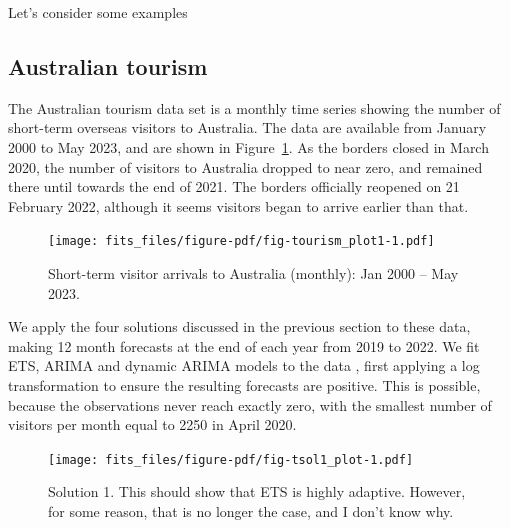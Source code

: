 \documentclass[11pt,a4paper,]{article}
\begin{document}
Let's consider some examples

\hypertarget{australian-tourism}{%
\subsection{Australian tourism}\label{australian-tourism}}

The Australian tourism data set is a monthly time series showing the
number of short-term overseas visitors to Australia. The data
\autocite{tourismdata} are available from January 2000 to May 2023, and
are shown in Figure~\ref{fig-tourism_plot1}. As the borders closed in
March 2020, the number of visitors to Australia dropped to near zero,
and remained there until towards the end of 2021. The borders officially
reopened on 21 February 2022, although it seems visitors began to arrive
earlier than that.

\begin{figure}

{\centering \texttt{[image: fits\_files/figure-pdf/fig-tourism\_plot1-1.pdf]}

}

\caption{\label{fig-tourism_plot1}Short-term visitor arrivals to
Australia (monthly): Jan 2000 -- May 2023.}

\end{figure}

We apply the four solutions discussed in the previous section to these
data, making 12 month forecasts at the end of each year from 2019 to
2022. We fit ETS, ARIMA and dynamic ARIMA models to the data
\autocite{fpp3}, first applying a log transformation to ensure the
resulting forecasts are positive. This is possible, because the
observations never reach exactly zero, with the smallest number of
visitors per month equal to 2250 in April 2020.

\begin{figure}[t]

{\centering \texttt{[image: fits\_files/figure-pdf/fig-tsol1\_plot-1.pdf]}

}

\caption{\label{fig-tsol1_plot}Solution 1. This should show that ETS is
highly adaptive. However, for some reason, that is no longer the case,
and I don't know why.}

\end{figure}
\end{document}
